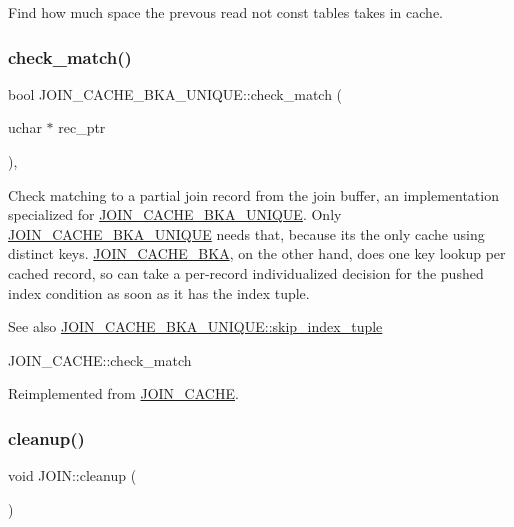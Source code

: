 Find how much space the prevous read not const tables takes in cache. \mbox{\label{group__Query__Optimizer_gafd031be055cee296d6629313a333b56f}} 
\subsubsection{\texorpdfstring{check\+\_\+match()}{check\_match()}}
{\footnotesize\ttfamily bool J\+O\+I\+N\+\_\+\+C\+A\+C\+H\+E\+\_\+\+B\+K\+A\+\_\+\+U\+N\+I\+Q\+U\+E\+::check\+\_\+match (\begin{DoxyParamCaption}\item[{uchar $\ast$}]{rec\+\_\+ptr }\end{DoxyParamCaption})\hspace{0.3cm}{\ttfamily [protected]}, {\ttfamily [virtual]}}

Check matching to a partial join record from the join buffer, an implementation specialized for \mbox{\hyperlink{classJOIN__CACHE__BKA__UNIQUE}{J\+O\+I\+N\+\_\+\+C\+A\+C\+H\+E\+\_\+\+B\+K\+A\+\_\+\+U\+N\+I\+Q\+UE}}. Only \mbox{\hyperlink{classJOIN__CACHE__BKA__UNIQUE}{J\+O\+I\+N\+\_\+\+C\+A\+C\+H\+E\+\_\+\+B\+K\+A\+\_\+\+U\+N\+I\+Q\+UE}} needs that, because it\textquotesingle{}s the only cache using distinct keys. \mbox{\hyperlink{classJOIN__CACHE__BKA}{J\+O\+I\+N\+\_\+\+C\+A\+C\+H\+E\+\_\+\+B\+KA}}, on the other hand, does one key lookup per cached record, so can take a per-\/record individualized decision for the pushed index condition as soon as it has the index tuple. \begin{DoxySeeAlso}{See also}
\mbox{\hyperlink{group__Query__Optimizer_ga6afa1e2231c8090ecae73554fca37c41}{J\+O\+I\+N\+\_\+\+C\+A\+C\+H\+E\+\_\+\+B\+K\+A\+\_\+\+U\+N\+I\+Q\+U\+E\+::skip\+\_\+index\+\_\+tuple}} 

J\+O\+I\+N\+\_\+\+C\+A\+C\+H\+E\+::check\+\_\+match 
\end{DoxySeeAlso}


Reimplemented from \mbox{\hyperlink{classJOIN__CACHE}{J\+O\+I\+N\+\_\+\+C\+A\+C\+HE}}.

\mbox{\label{group__Query__Optimizer_ga633799af14ae0a6e3abbac98b428c46f}} 
\subsubsection{\texorpdfstring{cleanup()}{cleanup()}\hspace{0.1cm}{\footnotesize\ttfamily [1/2]}}
{\footnotesize\ttfamily void J\+O\+I\+N\+::cleanup (\begin{DoxyParamCaption}{ }\end{DoxyParamCaption})}

